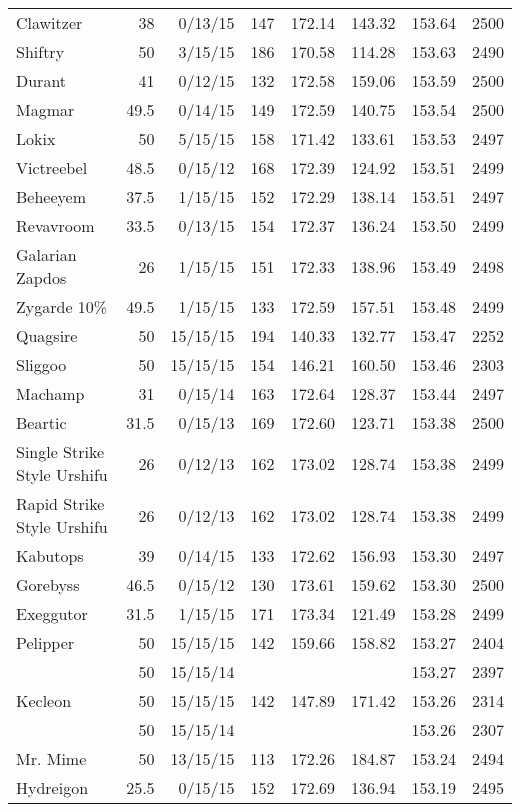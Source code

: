\begin{longtable}{lrrrrrrr}
Clawitzer & 38 & 0/13/15 & 147 & 172.14 & 143.32 & 153.64 & 2500\\
Shiftry & 50 & 3/15/15 & 186 & 170.58 & 114.28 & 153.63 & 2490\\
Durant & 41 & 0/12/15 & 132 & 172.58 & 159.06 & 153.59 & 2500\\
Magmar & 49.5 & 0/14/15 & 149 & 172.59 & 140.75 & 153.54 & 2500\\
Lokix & 50 & 5/15/15 & 158 & 171.42 & 133.61 & 153.53 & 2497\\
Victreebel & 48.5 & 0/15/12 & 168 & 172.39 & 124.92 & 153.51 & 2499\\
Beheeyem & 37.5 & 1/15/15 & 152 & 172.29 & 138.14 & 153.51 & 2497\\
Revavroom & 33.5 & 0/13/15 & 154 & 172.37 & 136.24 & 153.50 & 2499\\
Galarian Zapdos & 26 & 1/15/15 & 151 & 172.33 & 138.96 & 153.49 & 2498\\
Zygarde 10\% & 49.5 & 1/15/15 & 133 & 172.59 & 157.51 & 153.48 & 2499\\
Quagsire & 50 & 15/15/15 & 194 & 140.33 & 132.77 & 153.47 & 2252\\
Sliggoo & 50 & 15/15/15 & 154 & 146.21 & 160.50 & 153.46 & 2303\\
Machamp & 31 & 0/15/14 & 163 & 172.64 & 128.37 & 153.44 & 2497\\
Beartic & 31.5 & 0/15/13 & 169 & 172.60 & 123.71 & 153.38 & 2500\\
Single Strike Style Urshifu & 26 & 0/12/13 & 162 & 173.02 & 128.74 & 153.38 & 2499\\
Rapid Strike Style Urshifu & 26 & 0/12/13 & 162 & 173.02 & 128.74 & 153.38 & 2499\\
Kabutops & 39 & 0/14/15 & 133 & 172.62 & 156.93 & 153.30 & 2497\\
Gorebyss & 46.5 & 0/15/12 & 130 & 173.61 & 159.62 & 153.30 & 2500\\
Exeggutor & 31.5 & 1/15/15 & 171 & 173.34 & 121.49 & 153.28 & 2499\\
Pelipper & 50 & 15/15/15 & 142 & 159.66 & 158.82 & 153.27 & 2404\\
 & 50 & 15/15/14 & & & & 153.27 & 2397\\
Kecleon & 50 & 15/15/15 & 142 & 147.89 & 171.42 & 153.26 & 2314\\
 & 50 & 15/15/14 & & & & 153.26 & 2307\\
Mr. Mime & 50 & 13/15/15 & 113 & 172.26 & 184.87 & 153.24 & 2494\\
Hydreigon & 25.5 & 0/15/15 & 152 & 172.69 & 136.94 & 153.19 & 2495\\

\end{longtable}
